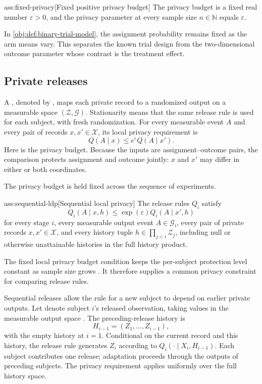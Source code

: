 \begin{assumptionv}{ass:fixed-privacy}[Fixed positive privacy budget]
The privacy budget is a fixed real number \(\varepsilon>0\), and the privacy parameter at every sample size \(n\in\mathbb{N}\) equals \(\varepsilon\).
\end{assumptionv}

In \cref{obj:def:binary-trial-model}, the assignment probability remains fixed as the arm means vary. This separates the known trial design from the two-dimensional outcome parameter whose contrast is the treatment effect.

\subsection{Private releases}

A , denoted by , maps each private record to a randomized output on a measurable space \((\mathcal Z,\mathcal G)\). Stationarity means that the same release rule is used for each subject, with fresh randomization. For every measurable event \(A\) and every pair of records \(x,x'\in\mathcal X\), its local privacy requirement is
\[
Q(A\mid x)\le e^\varepsilon Q(A\mid x').
\]
Here  is the privacy budget. Because the inputs are assignment--outcome pairs, the comparison protects assignment and outcome jointly: \(x\) and \(x'\) may differ in either or both coordinates.

The privacy budget is held fixed across the sequence of experiments.

\begin{assumptionv}{ass:sequential-ldp}[Sequential local privacy]
The release rules \(Q_i\) satisfy
\[
Q_i(A\mid x,h)\le \exp(\varepsilon)Q_i(A\mid x',h)
\]
for every stage \(i\), every measurable output event \(A\in\mathcal G_i\), every pair of private records \(x,x'\in\mathcal X\), and every history tuple \(h\in\prod_{j<i}\mathcal Z_j\), including null or otherwise unattainable histories in the full history product.
\end{assumptionv}

The fixed local privacy budget condition keeps the per-subject protection level constant as sample size grows \citep{Steinberger2024}. It therefore supplies a common privacy constraint for comparing release rules.

Sequential releases allow the rule for a new subject to depend on earlier private outputs. Let  denote subject \(i\)'s released observation, taking values in the measurable output space . The preceding-release history  is
\[
H_{i-1}=(Z_1,\ldots,Z_{i-1}),
\]
with the empty history at \(i=1\). Conditional on the current record and this history, the release rule  generates \(Z_i\) according to \(Q_i(\cdot\mid X_i,H_{i-1})\). Each subject contributes one release; adaptation proceeds through the outputs of preceding subjects. The privacy requirement applies uniformly over the full history space.

